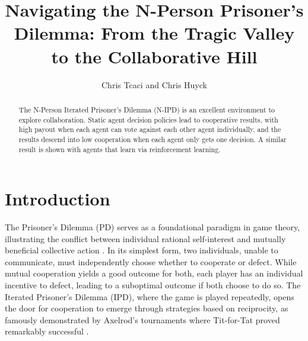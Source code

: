 \documentclass[]{llncs} %
\begin{document}
\title{Navigating the N-Person Prisoner's Dilemma: From the Tragic Valley
  to the Collaborative Hill}

\author{Chris Tcaci and Chris Huyck}

\maketitle


\begin{abstract}
  The N-Person Iterated Prisoner's Dilemma (N-IPD) is an excellent
  environment to explore collaboration. Static agent decision policies
  lead to cooperative results, with high payout when each agent can
  vote against each other agent individually, and the results descend
  into low cooperation when each agent only gets one decision.
  A similar result is shown with agents that learn via reinforcement learning.



\end{abstract}

\section{Introduction}
\label{sec:introduction}

The Prisoner's Dilemma (PD) serves as a foundational paradigm in game
theory, illustrating the conflict between individual rational
self-interest and mutually beneficial collective action
\cite{Axelrod}.  In its simplest form, two individuals, unable to
communicate, must independently choose whether to cooperate or
defect. While mutual cooperation yields a good outcome for both, each
player has an individual incentive to defect, leading to a suboptimal
outcome if both choose to do so. The Iterated Prisoner's Dilemma
(IPD), where the game is played repeatedly, opens the door for
cooperation to emerge through strategies based on reciprocity, as
famously demonstrated by Axelrod's tournaments where Tit-for-Tat
proved remarkably successful \cite{Axelrod}.
\end{document}
